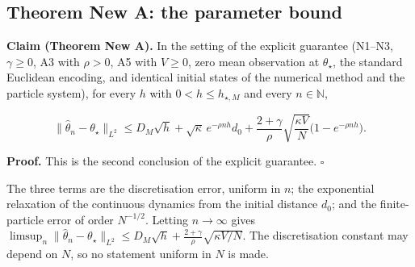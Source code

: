 \documentclass[11pt,a4paper]{report}
\begin{document}
\subsection{\texorpdfstring{Theorem New A: the parameter bound}{Theorem New A: the parameter bound}}


\textbf{Claim (Theorem New A).} In the setting of the explicit guarantee (N1–N3, \(\gamma\ge0\), A3 with \(\rho>0\), A5 with \(V\ge0\), zero mean observation at \(\theta_\star\), the standard Euclidean encoding, and identical initial states of the numerical method and the particle system), for every \(h\) with \(0<h\le h_{\star,M}\) and every \(n\in\mathbb N\),


\[\|\hat\theta_n-\theta_\star\|_{L^2}\le D_M\sqrt h+\sqrt\kappa\,e^{-\rho nh}d_0+\frac{2+\gamma}{\rho}\sqrt{\frac{\kappa V}{N}}\bigl(1-e^{-\rho nh}\bigr).\]


\textbf{Proof.} This is the second conclusion of the explicit guarantee. \(\square\)




The three terms are the discretisation error, uniform in \(n\); the exponential relaxation of the continuous dynamics from the initial distance \(d_0\); and the finite-particle error of order \(N^{-1/2}\). Letting \(n\to\infty\) gives \(\limsup_n\|\hat\theta_n-\theta_\star\|_{L^2}\le D_M\sqrt h+\frac{2+\gamma}\rho\sqrt{\kappa V/N}\). The discretisation constant may depend on \(N\), so no statement uniform in \(N\) is made.
\end{document}
